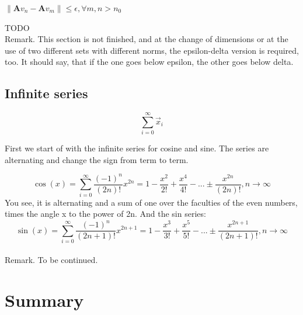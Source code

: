 \documentclass[a4paper]{article}
\begin{document}
\begin{Example}
\begin{center}
$\|\boldsymbol{A}v_{n} - \boldsymbol{A}v_{m}\| \leq \epsilon,  \forall m,n > n_{0}$
\end{center}

TODO\\

Remark. This section is not finished, and at the change of dimensions or at the use of two different sets with different norms, the epsilon-delta version is required, too. It should say, that if the one goes below epsilon, the other goes below delta.\\

\subsection{Infinite series}

\begin{displaymath}
    \sum_{i=0}^{\infty}\vec{x}_{i}
\end{displaymath}

First we start of with the infinite series for cosine and sine. The series are alternating and change the sign from term to term.

\begin{displaymath}
    \cos(x) = \sum_{i=0}^{\infty}\frac{(-1)^{n}}{(2n)!}x^{2n} = 1 - \frac{x^{2}}{2!} + \frac{x^{4}}{4!} - ... \pm\frac{x^{2n}}{(2n)!}, n\rightarrow\infty
\end{displaymath}
You see, it is alternating and a sum of one over the faculties of the even numbers, times the angle x to the power of 2n.
And the sin series:\\
\begin{displaymath}
    \sin(x) = \sum_{i=0}^{\infty}\frac{(-1)^{n}}{(2n+1)!}x^{2n+1} = 1 - \frac{x^{3}}{3!} + \frac{x^{5}}{5!} - ... \pm\frac{x^{2n+1}}{(2n+1)!}, n\rightarrow\infty
\end{displaymath}\\


Remark. To be continued.

\section{Summary}


\end{Example}
\end{document}
